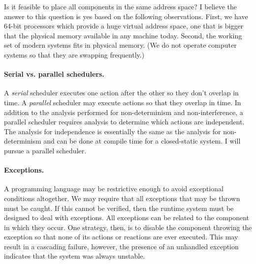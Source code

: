 Is it feasible to place all components in the same address space?
I believe the answer to this question is yes based on the following observations.
First, we have 64-bit processors which provide a huge virtual address space, one that is bigger that the physical memory available in any machine today.
Second, the working set of modern systems fits in physical memory.
(We do not operate computer systems so that they are swapping frequently.)

\paragraph{Serial vs. parallel schedulers.}
A \emph{serial} scheduler executes one action after the other so they don't overlap in time.
A \emph{parallel} scheduler may execute actions so that they overlap in time.
In addition to the analysis performed for non-determinism and non-interference, a parallel scheduler requires analysis to determine which actions are independent.
The analysis for independence is essentially the same as the analysis for non-determinism and can be done at compile time for a closed-static system.
I will pursue a parallel scheduler.

\paragraph{Exceptions.}
A programming language may be restrictive enough to avoid exceptional conditions altogether.
We may require that all exceptions that may be thrown must be caught.
If this cannot be verified, then the runtime system must be designed to deal with exceptions.
All exceptions can be related to the component in which they occur.
One strategy, then, is to disable the component throwing the exception so that none of its actions or reactions are ever executed.
This may result in a cascading failure, however, the presence of an unhandled exception indicates that the system was always unstable.

